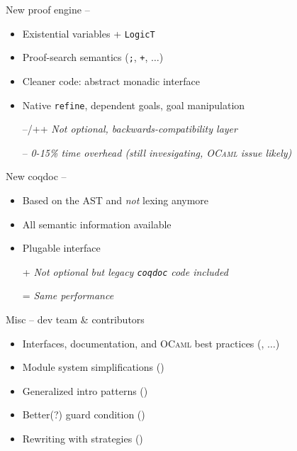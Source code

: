 \begin{subsecframe}{New proof engine -- }

  \begin{itemize}
  \item Existential variables + \texttt{LogicT}
  \item Proof-search semantics (\texttt{;}, \texttt{+}, $\ldots$)
  \item Cleaner code: abstract monadic interface
  \item Native \texttt{refine}, dependent goals, goal manipulation
  \end{itemize}
  
  \begin{itemize}
  \item[--/++] \emph{Not optional, backwards-compatibility layer}
  \item[--] \emph{0-15\% time overhead (still invesigating, \textsc{OCaml} issue likely)}
  \end{itemize}

\end{subsecframe}
\begin{subsecframe}{New coqdoc -- }
  \begin{itemize}
  \item Based on the AST and \alert{\emph{not}} lexing anymore
  \item All semantic information available
  \item Plugable interface
  \end{itemize}

  \begin{itemize}
  \item[+] \emph{Not optional but legacy \texttt{coqdoc} code included}
  \item[=] \emph{Same performance}
  \end{itemize}
  
\end{subsecframe}

\begin{subsecframe}{Misc -- \Coq dev team \& contributors}
  \begin{itemize}
  \item Interfaces, documentation, and \textsc{OCaml} best practices
    (, $\ldots$)
  \item Module system simplifications ()
  \item Generalized intro patterns ()
  \item Better(?) guard condition ()
  \item Rewriting with strategies ()
  \end{itemize}

\end{subsecframe}

